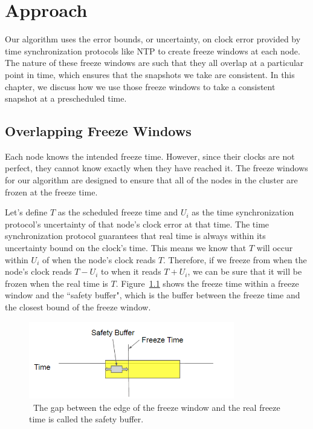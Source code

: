 \chapter{Approach}
\label{sec:approach}

Our algorithm uses the error bounds, or uncertainty, on clock error provided by time
synchronization protocols like NTP to create freeze windows at each node. 
The nature of these freeze windows are such that they all overlap at a 
particular point in time, which ensures that the snapshots we take are 
consistent. In this chapter, we discuss how we use those freeze windows to 
take a consistent snapshot at a prescheduled time.

\section{Overlapping Freeze Windows}

Each node knows the intended freeze time. However, since their
clocks are not perfect, they cannot know exactly when they have reached it.
The freeze windows for our algorithm are designed to ensure
that all of the nodes in the cluster are frozen at the freeze time.

Let's define $T$ as the scheduled freeze time and $U_i$ as the time
synchronization protocol's uncertainty of that node's clock error at that time.
The time synchronization protocol guarantees that real time is always within 
its uncertainty bound on the clock's time. This means we know that $T$ will 
occur within $U_i$ of when the node's clock reads $T$. Therefore, if we freeze 
from when the node's clock reads $T - U_i$ to when it reads $T + U_i$, we can 
be sure that it will be frozen when the real time is $T$. 
Figure~\ref{fig:safety-buff} shows the freeze time within a freeze window and 
the ``safety buffer", which is the buffer between the freeze time and the 
closest bound of the freeze window.

\begin{figure}
\includegraphics[width=0.8\textwidth]{safety-diagram.png}
\caption{~The gap between the edge of the freeze window and the real freeze time is called the safety buffer.}
\label{fig:safety-buff}
\end{figure}


